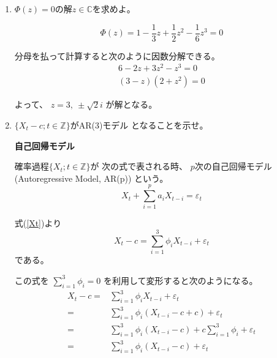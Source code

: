 \documentclass[12pt,b5paper]{ltjsarticle}
\begin{document}
\begin{enumerate}
 \item
      $\Phi(z)=0$の解$z\in\mathbb{C}$を求めよ。

      \dotfill

      \begin{equation}
       \Phi (z) = 1-\frac{1}{3}z +\frac{1}{2} z^2 - \frac{1}{6} z^3=0
      \end{equation}

      分母を払って計算すると次のように因数分解できる。
      \begin{align}
       6-2z +3 z^2 - z^3=0\\
       (3-z)(2+z^2)=0
      \end{align}

      よって、
      $z=3,\ \pm\sqrt{2}i$
      が解となる。

      \hrulefill

 \item
      $\{X_t-c;t\in\mathbb{Z}\}$がAR(3)モデル
      となることを示せ。

      \dotfill


      \textbf{自己回帰モデル}
      
      確率過程$\{ X_t ; t\in\mathbb{Z} \}$が
      次の式で表される時、
      $p$次の自己回帰モデル(Autoregressive Model, AR(p))
      という。
      \begin{equation}
       X_t+\sum_{i=1}^{p}a_{i}X_{t-i}=\varepsilon_t
      \end{equation}

      \dotfill

      式(\ref{Xt})より
      \begin{equation}
       X_{t}-c = \sum_{i=1}^{3}\phi_{i}X_{t-i}+\varepsilon_{t}
      \end{equation}
      である。

      この式を
      $\sum_{i=1}^{3}\phi_{i}=0$
      を利用して変形すると次のようになる。
      \begin{align}
       X_{t}-c =& \sum_{i=1}^{3}\phi_{i}X_{t-i}+\varepsilon_{t}\\
       =& \sum_{i=1}^{3}\phi_{i}(X_{t-i}-c+c)+\varepsilon_{t}\\
       =& \sum_{i=1}^{3}\phi_{i}(X_{t-i}-c)+c\sum_{i=1}^{3}\phi_{i}+\varepsilon_{t}\\
       =& \sum_{i=1}^{3}\phi_{i}(X_{t-i}-c)+\varepsilon_{t}
      \end{align}
      

\end{enumerate}
\end{document}

